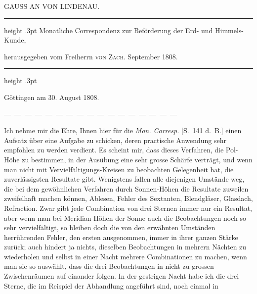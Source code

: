 \par\clearpage
\endgroup
\thispagestyle{empty}
%
\vspace*{2\baselineskip}
\begin{center}\large GAUSS AN VON LINDENAU.\end{center}
\begin{center}\parbox{.78\linewidth}{\centering\fontsize{8.2}{10.2}\selectfont\frenchspacing
\hrule height .3pt\relax\vspace{2.5pt}
Monatliche Correspondenz zur Beförderung der Erd- und Himmels-Kunde,\par
herausgegeben vom Freiherrn \textsc{von Zach}. September 1808.\par
\vspace{2.5pt}\hrule height .3pt\relax
}\end{center}
\begin{flushright}Göttingen am 30. August 1808.\end{flushright}
\begin{center}\small
—\ —\ —\ —\ —\ —\ —\ —\ —\ —\ —\ —\ —\ —\ —\ —\ —
\end{center}
\par\indent Ich nehme mir die Ehre, Ihnen hier für die \emph{Mon. Corresp.} [S.\ 141 d.\ B.] einen Aufsatz über eine Aufgabe zu schicken, deren practische Anwendung sehr empfohlen zu werden verdient. Es scheint mir, dass dieses Verfahren, die Pol-Höhe zu bestimmen, in der Ausübung eine sehr grosse Schärfe verträgt, und wenn man nicht mit Vervielfältigungs-Kreisen zu beobachten Gelegenheit hat, die zuverlässigsten Resultate gibt. Wenigstens fallen alle diejenigen Umstände weg, die bei dem gewöhnlichen Verfahren durch Sonnen-Höhen die Resultate zuweilen zweifelhaft machen können, Ablesen, Fehler des Sextanten, Blendgläser, Glasdach, Refraction. Zwar gibt jede Combination von drei Sternen immer nur ein Resultat, aber wenn man bei Meridian-Höhen der Sonne auch die Beobachtungen noch so sehr vervielfältigt, so bleiben doch die von den erwähnten Umständen herrührenden Fehler, den ersten ausgenommen, immer in ihrer ganzen Stärke zurück; auch hindert ja nichts, dieselben Beobachtungen in mehrern Nächten zu wiederholen und selbst in einer Nacht mehrere Combinationen zu machen, wenn man sie so auswählt, dass die drei Beobachtungen in nicht zu grossen Zwischenräumen auf einander folgen. In der gestrigen Nacht habe ich die drei Sterne, die im Reispiel der Abhandlung angeführt sind, noch einmal in
